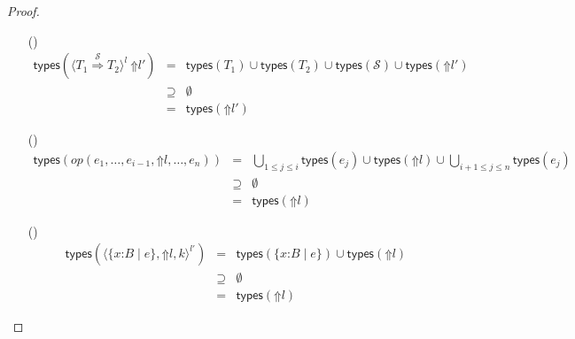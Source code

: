 \documentclass[9pt]{extarticle}
\newcommand{\ottnt}[1]{\mathit{#1}}
\newcommand{\ottmv}[1]{\mathit{#1}}
\newcommand{\ottsym}[1]{#1}
\begin{document}
\begin{lemma}
\begin{proof}
{\begin{itemize}
\[\begin{array}{rclr}
        &=&  \mathsf{types} (  \mathord{\Uparrow}  \ottnt{l}  ) 
      \end{array} \]
    \item[(\E{CastRaise})]  \[ \begin{array}{rclr}
         \mathsf{types} (  \langle  \ottnt{T_{{\mathrm{1}}}}  \mathord{ \overset{ \mathcal{S} }{\Rightarrow} }  \ottnt{T_{{\mathrm{2}}}}  \rangle^{ \ottnt{l} } ~   \mathord{\Uparrow}  \ottnt{l'}   )  &=&     \mathsf{types} ( \ottnt{T_{{\mathrm{1}}}} )   \cup   \mathsf{types} ( \ottnt{T_{{\mathrm{2}}}} )    \cup   \mathsf{types} ( \mathcal{S} )    \cup   \mathsf{types} (  \mathord{\Uparrow}  \ottnt{l'}  )   & \\
        &\supseteq&  \emptyset  & \\
        &=&  \mathsf{types} (  \mathord{\Uparrow}  \ottnt{l'}  ) 
      \end{array} \]
    \item[(\E{OpRaise})]  \[ \begin{array}{rclr}
         \mathsf{types} ( \ottnt{op}  \ottsym{(}  \ottnt{e_{{\mathrm{1}}}}  \ottsym{,}  \dots  \ottsym{,}  \ottnt{e_{{\ottmv{i}-1}}}  \ottsym{,}   \mathord{\Uparrow}  \ottnt{l}   \ottsym{,}  \dots  \ottsym{,}  \ottnt{e_{\ottmv{n}}}  \ottsym{)} )  &=& 
        \bigcup_{1 \le j \le i}  \mathsf{types} ( \ottnt{e_{\ottmv{j}}} )  \cup  \mathsf{types} (  \mathord{\Uparrow}  \ottnt{l}  )  \cup 
        \bigcup_{i+1 \le j \le n}  \mathsf{types} ( \ottnt{e_{\ottmv{j}}} ) & \\
        &\supseteq&  \emptyset  & \\
        &=&  \mathsf{types} (  \mathord{\Uparrow}  \ottnt{l}  ) 
      \end{array} \]
    \item[(\E{CheckRaise})]  \[ \begin{array}{rclr}
         \mathsf{types} (  \langle   \{ \mathit{x} \mathord{:} \ottnt{B} \mathrel{\mid} \ottnt{e} \}  ,   \mathord{\Uparrow}  \ottnt{l}  ,  \ottnt{k}  \rangle^{ \ottnt{l'} }  )  &=&   \mathsf{types} (  \{ \mathit{x} \mathord{:} \ottnt{B} \mathrel{\mid} \ottnt{e} \}  )   \cup   \mathsf{types} (  \mathord{\Uparrow}  \ottnt{l}  )   & \\
        &\supseteq&  \emptyset  & \\
        &=&  \mathsf{types} (  \mathord{\Uparrow}  \ottnt{l}  ) 
      \end{array} \]
    \end{itemize}
      
}
\end{proof}
\end{lemma}
\end{document}
